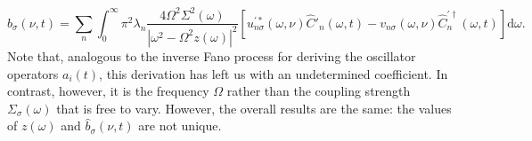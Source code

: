 \begin{equation}
\hat{b}_\sigma(\nu,t) = \sum_n\int_0^\infty\pi^2\lambda_n\frac{4\Omega^2\Sigma^2(\omega)}{|\omega^2 - \Omega^2z(\omega)|^2}\left[u^{\prime*}_{n\sigma}(\omega,\nu)\hat{C}'_n(\omega,t) - v_{n\sigma}(\omega,\nu)\hat{C}^{\prime\dagger}_n(\omega,t)\right]\mathrm{d}\omega.
\end{equation}
Note that, analogous to the inverse Fano process for deriving the oscillator operators $a_i(t)$, this derivation has left us with an undetermined coefficient. In contrast, however, it is the frequency $\Omega$ rather than the coupling strength $\Sigma_\sigma(\omega)$ that is free to vary. However, the overall results are the same: the values of $z(\omega)$ and $\hat{b}_\sigma(\nu,t)$ are not unique.












